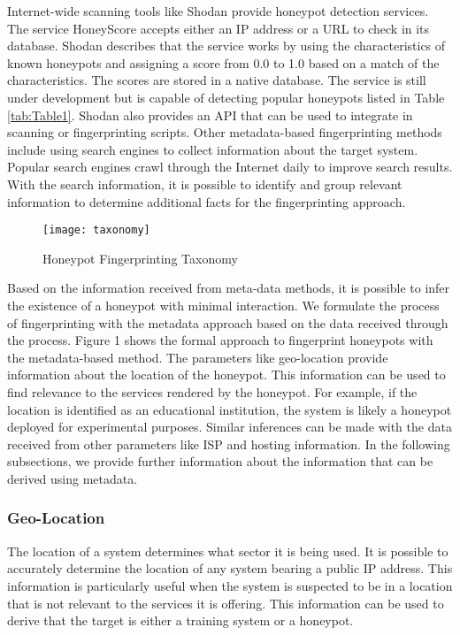 Internet-wide scanning tools like Shodan provide honeypot detection services. The service HoneyScore accepts either an IP address or a URL to check in its database. Shodan describes that the service works by using the characteristics of known honeypots and assigning a score from 0.0 to 1.0 based on a match of the characteristics. The scores are stored in a native database. The service is still under development but is capable of detecting popular honeypots listed in Table \ref{tab:Table1}. Shodan also provides an API that can be used to integrate in scanning or fingerprinting scripts. Other metadata-based fingerprinting methods include using search engines to collect information about the target system. Popular search engines crawl through the Internet daily to improve search results. With the search information, it is possible to identify and group relevant information to determine additional facts for the fingerprinting approach. 

\begin{figure}
    \centering
    \texttt{[image: taxonomy]}
    \caption{Honeypot Fingerprinting Taxonomy}
    \label{fig:taxonomy}
\end{figure}


Based on the information received from meta-data methods, it is possible to infer the existence of a honeypot with minimal interaction. We formulate the process of fingerprinting with the metadata approach based on the data received through the process. Figure 1 shows the formal approach to fingerprint honeypots with the metadata-based method. The parameters like geo-location provide information about the location of the honeypot. This information can be used to find relevance to the services rendered by the honeypot. For example, if the location is identified as an educational institution, the system is likely a honeypot deployed for experimental purposes. Similar inferences can be made with the data received from other parameters like ISP and hosting information. In the following subsections, we provide further information about the information that can be derived using metadata. 


\subsubsection{Geo-Location}
The location of a system determines what sector it is being used. It is possible to accurately determine the location of any system bearing a public IP address. This information is particularly useful when the system is suspected to be in a location that is not relevant to the services it is offering. This information can be used to derive that the target is either a training system or a honeypot. 

